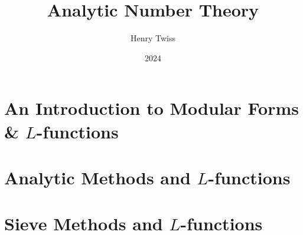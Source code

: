 \documentclass[12pt,oneside]{book}
\title{Analytic Number Theory}
\author{Henry Twiss}
\date{2024}
\begin{document}
\maketitle
\pagestyle{empty}
\tableofcontents
\setcounter{page}{0}

\part{An Introduction to Modular Forms \& \texorpdfstring{$L$}{L}-functions}
  \pagestyle{fancy}
  
  
  
  

\part{Analytic Methods and \texorpdfstring{$L$}{L}-functions}
  
  
  
  
  

\part{Sieve Methods and \texorpdfstring{$L$}{L}-functions}
  
  



\printindex


\end{document}
